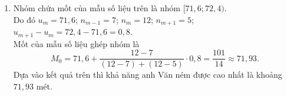 \begin{bt}
{\begin{enumerate}
\begin{center}
\begin{tabular}{|c|c|c|c|c|c|}
					\hline
				\end{tabular}
			\end{center}
			Cự li trung bình mỗi lần ném của anh Văn qua bảng tần số ghép nhóm
			\[(69{,}6\cdot 4+70{,}4\cdot 2+71{,}2\cdot 7+72\cdot 12+72{,}8\cdot 5):30=71{,}52\ (\mathrm{m}).  \]
			\item Nhóm chứa mốt của mẫu số liệu trên là nhóm $[71{,}6; 72{,}4)$.\\
			Do đó $u_m=71{,}6$; $n_{m-1}=7$; $n_m=12$; $n_{m+1}=5$; $u_{m+1}-u_m=72{,}4-71{,}6=0{,}8$.\\
			Mốt của mẫu số liệu ghép nhóm là
			\[M_0=71{,}6+\dfrac{12-7}{(12-7)+(12-5)} \cdot 0{,}8=\dfrac{101}{14} \approx 71{,}93. \]
			Dựa vào kết quả trên thì khả năng anh Văn ném được cao nhất là khoảng $71{,}93$ mét.
		\end{enumerate}
	}
\end{bt}

